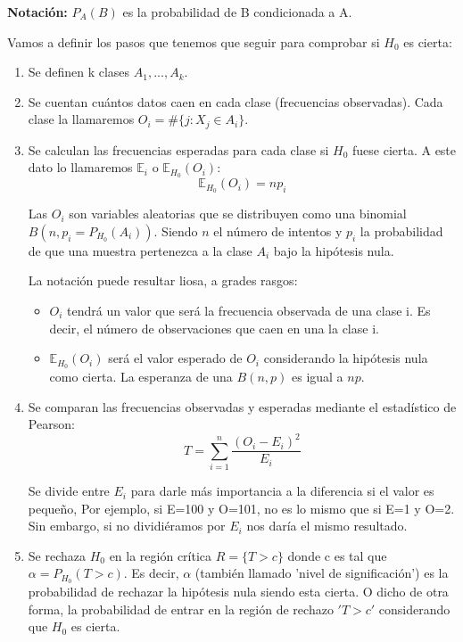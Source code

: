 \documentclass[nochap]{apuntes}
\begin{document}
\textbf{Notación: }$P_A(B)$ es la probabilidad de B condicionada a A.

Vamos a definir los pasos que tenemos que seguir para comprobar si $H_0$ es cierta:
\begin{enumerate}
\item Se definen k clases $A_1,...,A_k$. 

\item Se cuentan cuántos datos caen en cada clase (frecuencias observadas). Cada clase la llamaremos $O_i=\#\{j:X_j\in A_i\}$.

\item Se calculan las frecuencias esperadas para cada clase si $H_0$ fuese cierta. A este dato lo llamaremos $\mathbb{E}_i$ o $\mathbb{E}_{H_0}(O_i)$: 
\[
\mathbb{E}_{H_0}(O_i) = np_i
\]

\obs Las $O_i$ son variables aleatorias que se distribuyen como una binomial $B(n, p_i=P_{H_0}(A_i))$. Siendo $n$ el número de intentos y $p_i$ la probabilidad de que una muestra pertenezca a la clase $A_i$ bajo la hipótesis nula. 

La notación puede resultar liosa, a grades rasgos:
\begin{itemize}
\item $O_i$ tendrá un valor que será la frecuencia observada de una clase i. Es decir, el número de observaciones que caen en una la clase i.
\item $\mathbb{E}_{H_0}(O_i)$ será el valor esperado de $O_i$ considerando la hipótesis nula como cierta. La esperanza de una $B(n,p)$ es igual a $np$.
\end{itemize}

\item Se comparan las frecuencias observadas y esperadas mediante el estadístico de Pearson:
\[
T = \sum_{i=1}^n \frac{(O_i-E_i)^2}{E_i}
\]

Se divide entre $E_i$ para darle más importancia a la diferencia si el valor es pequeño, Por ejemplo, si E=100 y O=101, no es lo mismo que si E=1 y O=2. Sin embargo, si no dividiéramos por $E_i$ nos daría el mismo resultado.

\item Se rechaza $H_0$ en la región crítica $R=\{T > c\}$ donde c es tal que $\alpha=P_{H_0}(T>c)$. Es decir, $\alpha$ (también llamado 'nivel de significación') es la probabilidad de rechazar la hipótesis nula siendo esta cierta. O dicho de otra forma, la probabilidad de entrar en la región de rechazo $'T>c'$ considerando que $H_0$ es cierta.
\end{enumerate}
\end{document}
